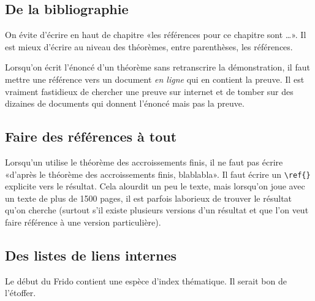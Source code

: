 \subsection{De la bibliographie}

On évite d'écrire en haut de chapitre «les références pour ce chapitre sont \ldots». Il est mieux d'écrire au niveau des théorèmes, entre parenthèses, les références.

Lorsqu'on écrit l'énoncé d'un théorème sans retranscrire la démonstration, il faut mettre une référence vers un document \emph{en ligne} qui en contient la preuve. Il est vraiment fastidieux de chercher une preuve sur internet et de tomber sur des dizaines de documents qui donnent l'énoncé mais pas la preuve.

\subsection{Faire des références à tout}

Lorsqu'un utilise le théorème des accroissements finis, il ne faut pas écrire «d'après le théorème des accroissements finis, blablabla». Il faut écrire un \verb+\ref{}+ explicite vers le résultat. Cela alourdit un peu le texte, mais lorsqu'on joue avec un texte de plus de 1500 pages, il est parfois laborieux de trouver le résultat qu'on cherche (surtout s'il existe plusieurs versions d'un résultat et que l'on veut faire référence à une version particulière).

\subsection{Des listes de liens internes}

Le début du Frido contient une espèce d'index thématique. Il serait bon de l'étoffer.


